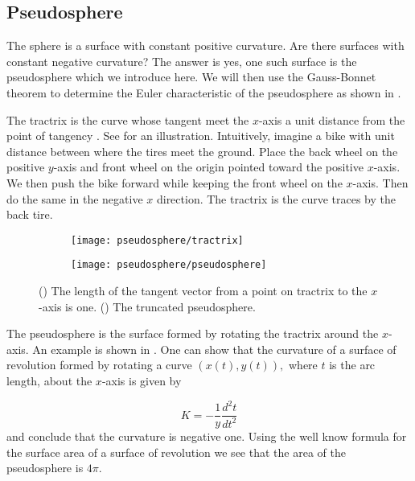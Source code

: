 \subsection{Pseudosphere}
\label{sec:pseudosphere}

The sphere is a surface with constant positive curvature.
Are there surfaces with constant negative curvature?
The answer is yes, one such surface is the pseudosphere
which we introduce here. We will then use the Gauss-Bonnet
theorem to determine the Euler characteristic of the pseudosphere as
shown in \cite{pseudo-app}.


The tractrix is the curve whose tangent meet the $x$-axis a unit distance
from the point of tangency \cite{thurston}. See  for an illustration.
Intuitively, imagine a bike with unit distance between where the tires meet the ground.
Place the back wheel on the positive $y$-axis and front wheel on the origin pointed
toward the positive $x$-axis. We then push the bike forward while keeping the front
wheel on the $x$-axis. Then do the same in the negative $x$ direction.
The tractrix is the curve traces by the back tire. 


\begin{figure}[htb]
    \captionsetup[subfigure]{justification=centering}
    \centering
    \begin{subfigure}[b]{0.4\textwidth}
        \texttt{[image: pseudosphere/tractrix]}
       \subcaption{}\label{fig:tractrix}
    \end{subfigure}
        \hspace{1cm}
        \begin{subfigure}[b]{0.4\textwidth}
        \texttt{[image: pseudosphere/pseudosphere]}
        \subcaption{}\label{fig:pseudosphere}
        \end{subfigure}
    \caption{() The length of the tangent vector from a point on tractrix to the $x$-axis is one.
        () The truncated pseudosphere.
    }
    \label{fig:tractrix-pseudosphere}
\end{figure}



The pseudosphere is the surface formed by rotating the tractrix around the $x$-axis.
An example is shown in .
One can show that the curvature of a surface of revolution formed by rotating a curve
$(x(t),y(t)),$ where $t$ is the arc length, about the $x$-axis is given by

$$K=-\frac{1}{y}\frac{d^2t}{dt^2}$$
and conclude that the curvature is negative one.
Using the well know formula for the surface area of a surface of revolution
we see that the area of the pseudosphere is $4\pi$.

